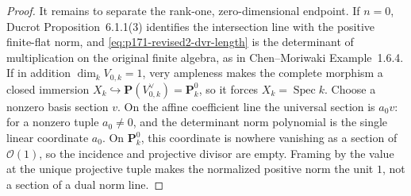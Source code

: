 \begin{proof}
It remains to separate the rank-one, zero-dimensional endpoint.  If
\(n=0\), Ducrot Proposition~6.1.1(3) identifies the intersection line with
the positive finite-flat norm, and
\eqref{eq:p171-revised2-dvr-length} is the determinant of multiplication on
the original finite algebra, as in Chen--Moriwaki Example~1.6.4.  If in
addition \(\dim_kV_{0,k}=1\), very ampleness makes the complete morphism a
closed immersion
\(X_k\hookrightarrow\mathbf P(V_{0,k}^\vee)=\mathbf P^0_k\), so it forces
\(X_k=\operatorname{Spec}k\).  Choose a nonzero basis section \(v\).  On
the affine coefficient line the universal section is \(a_0v\): for a
nonzero tuple \(a_0\ne0\), and the determinant norm polynomial is the
single linear coordinate \(a_0\).  On \(\mathbf P^0_k\), this coordinate
is nowhere vanishing as a section of \(\mathcal O(1)\), so the incidence
and projective divisor are empty.  Framing by the value at the unique
projective tuple makes the normalized positive norm the unit \(1\), not a
section of a dual norm line.
\end{proof}

